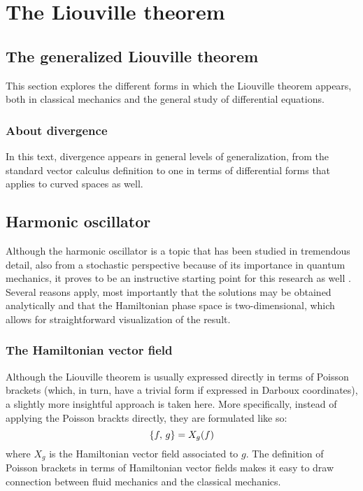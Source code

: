 \chapter{The Liouville theorem}

\section{The generalized Liouville theorem}
This section explores the different forms in which the Liouville theorem appears, both in classical mechanics and the general study of differential equations.

\subsection{About divergence}
In this text, divergence appears in general levels of generalization, from the standard vector calculus definition to one in terms of differential forms that applies to curved spaces as well.

\section{Harmonic oscillator}
Although the harmonic oscillator is a topic that has been studied in tremendous detail, also from a stochastic perspective because of its importance in quantum mechanics, it proves to be an instructive starting point for this research as well \cite{Dekker1975}. Several reasons apply, most importantly that the solutions may be obtained analytically and that the Hamiltonian phase space is two-dimensional, which allows for straightforward visualization of the result.

\subsection{The Hamiltonian vector field}
Although the Liouville theorem is usually expressed directly in terms of Poisson brackets (which, in turn, have a trivial form if expressed in Darboux coordinates), a slightly more insightful approach is taken here. More specifically, instead of applying the Poisson brackts directly, they are formulated like so:
$$ \qty{f,\,g} = X_g(f) $$
where $X_g$ is the Hamiltonian vector field associated to $g$. The definition of Poisson brackets in terms of Hamiltonian vector fields makes it easy to draw connection between fluid mechanics and the classical mechanics.

